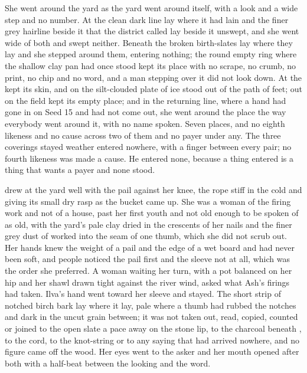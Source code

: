 She went around the yard as the yard went around itself, with a look and a wide step and no number. At  the clean dark line lay where it had lain and the finer grey hairline beside it that the district called  lay beside it unswept, and she went wide of both and swept neither. Beneath  the broken birth-slates lay where they lay and she stepped around them, entering nothing; the round empty ring where the shallow clay pan had once stood kept its place with no scrape, no crumb, no print, no chip and no word, and a man stepping over it did not look down. At  the  kept its skin, and on  the silt-clouded plate of ice stood out of the path of feet; out on  the field kept its empty place; and in the returning line, where a hand had gone in on Seed 15 and had not come out, she went around the place the way everybody went around it, with no name spoken. Seven places, and no eighth likeness and no cause across two of them and no payer under any. The three coverings stayed weather entered nowhere, with a finger between every pair; no fourth likeness was made a cause. He entered none, because a thing entered is a thing that wants a payer and none stood.

 drew at the yard well with the pail against her knee, the rope stiff in the  cold and giving its small dry rasp as the bucket came up. She was a woman of the firing work and not of a house, past her first youth and not old enough to be spoken of as old, with the yard's pale clay dried in the crescents of her nails and the finer grey dust of  worked into the seam of one thumb, which she did not scrub out. Her hands knew the weight of a pail and the edge of a wet board and had never been soft, and people noticed the pail first and the sleeve not at all, which was the order she preferred. A woman waiting her turn, with a pot balanced on her hip and her shawl drawn tight against the river wind, asked what Ash's firings had taken. Ilva's hand went toward her sleeve and stayed. The short strip of notched birch bark lay where it lay, pale where a thumb had rubbed the notches and dark in the uncut grain between; it was not taken out, read, copied, counted or joined to the open slate a pace away on the stone lip, to the charcoal beneath , to the cord, to the knot-string or to any saying that had arrived nowhere, and no figure came off the wood. Her eyes went to the asker and her mouth opened after both with a half-beat between the looking and the word.

